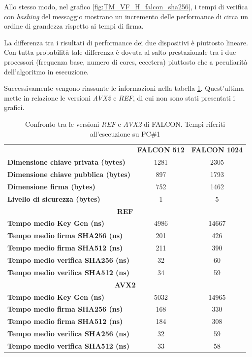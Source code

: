 Allo stesso modo, nel grafico \ref{fig:TM_VF_H_falcon_sha256}, i tempi di verifica con \textit{hashing} del messaggio mostrano un incremento delle performance di circa un ordine di grandezza rispetto ai tempi di firma.

La differenza tra i risultati di performance dei due dispositivi è piuttosto lineare. Con tutta probabilità tale differenza è dovuta al salto prestazionale tra i due processori (frequenza base, numero di cores, eccetera) piuttosto che a peculiarità dell'algoritmo in esecuzione.

Successivamente vengono riassunte le informazioni nella tabella \ref{tab:falcon_comparison}. Quest'ultima mette in relazione le versioni \textit{AVX2} e \textit{REF}, di cui non sono stati presentati i grafici.

\begin{table}[H]
    \centering
    \begin{tabular}{lcc}
        \toprule
        & \textbf{FALCON 512} & \textbf{FALCON 1024} \\
        \cmidrule(lr){1-3}
        \textbf{Dimensione chiave privata (bytes)} & 1281 & 2305 \\
        \textbf{Dimensione chiave pubblica (bytes)} & 897 & 1793 \\
        \textbf{Dimensione firma (bytes)} & 752 & 1462 \\
        \textbf{Livello di sicurezza (bytes)} & 1 & 5 \\
        \midrule
        \multicolumn{3}{c}{\textbf{REF}} \\
        \cmidrule(lr){1-3}
        \textbf{Tempo medio Key Gen (ns)} & 4986 & 14667 \\
        \textbf{Tempo medio firma SHA256 (ns)} & 201 & 426 \\
        \textbf{Tempo medio firma SHA512 (ns)} & 211 & 390 \\
        \textbf{Tempo medio verifica SHA256 (ns)} & 32 & 60 \\
        \textbf{Tempo medio verifica SHA512 (ns)} & 34 & 59 \\
        \midrule
        \multicolumn{3}{c}{\textbf{AVX2}} \\
        \cmidrule(lr){1-3}
        \textbf{Tempo medio Key Gen (ns)} & 5032 & 14965 \\
        \textbf{Tempo medio firma SHA256 (ns)} & 168 & 330 \\
        \textbf{Tempo medio firma SHA512 (ns)} & 184 & 308 \\
        \textbf{Tempo medio verifica SHA256 (ns)} & 32 & 59 \\
        \textbf{Tempo medio verifica SHA512 (ns)} & 33 & 58 \\
        \bottomrule
    \end{tabular}
    \caption{Confronto tra le versioni \textit{REF} e \textit{AVX2} di FALCON. Tempi riferiti all'esecuzione su PC\#1}
    \label{tab:falcon_comparison}
\end{table}



